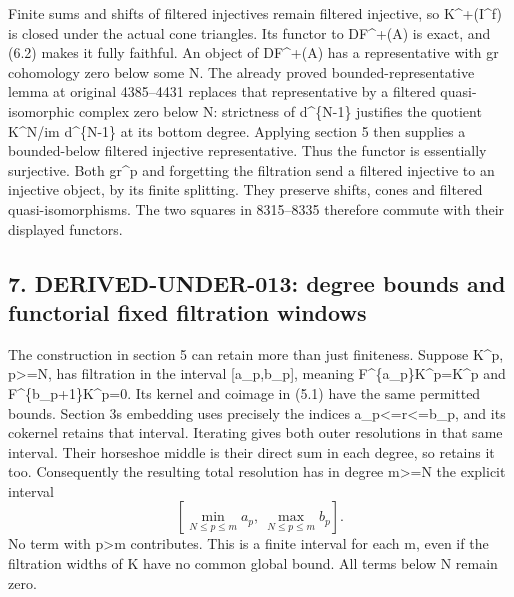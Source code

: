 Finite sums and shifts of filtered injectives remain filtered injective,\allowbreak{} so K\textasciicircum{}\allowbreak{}+(I\textasciicircum{}f)\allowbreak{} is closed under the actual cone triangles. Its functor to DF\textasciicircum{}\allowbreak{}+(A)\allowbreak{} is exact,\allowbreak{} and (6.2)\allowbreak{} makes it fully faithful. An object of DF\textasciicircum{}\allowbreak{}+(A)\allowbreak{} has a representative with gr cohomology zero below some N. The already proved bounded-representative lemma at original 4385–\allowbreak{}4431 replaces that representative by a filtered quasi-isomorphic complex zero below N:\allowbreak{} strictness of d\^{}\{N-1\} justifies the quotient K\textasciicircum{}N/\allowbreak{}im d\^{}\{N-1\} at its bottom degree. Applying section 5 then supplies a bounded-below filtered injective representative. Thus the functor is essentially surjective. Both gr\^{}p and forgetting the filtration send a filtered injective to an injective object,\allowbreak{} by its finite splitting. They preserve shifts,\allowbreak{} cones and filtered quasi-isomorphisms. The two squares in 8315–\allowbreak{}8335 therefore commute with their displayed functors.

\subsection{\texorpdfstring{7. DERIVED-UNDER-013:\allowbreak{} degree bounds and functorial fixed filtration windows}{7.  degree bounds and functorial fixed filtration windows}}\label{proofs-7589-8350-derived-under-013-degree-bounds-and-functorial-fixed-filtration-windows}

The construction in section 5 can retain more than just finiteness. Suppose K\textasciicircum{}p,\allowbreak{} p>\allowbreak{}=N,\allowbreak{} has filtration in the interval [a\_\allowbreak{}p,\allowbreak{}b\_\allowbreak{}p]\allowbreak{},\allowbreak{} meaning F\textasciicircum{}\{a\_\allowbreak{}p\}K\textasciicircum{}p\allowbreak{}=K\textasciicircum{}p and F\textasciicircum{}\{b\_\allowbreak{}p\allowbreak{}+1\}K\textasciicircum{}p\allowbreak{}=0. Its kernel and coimage in (5.1)\allowbreak{} have the same permitted bounds. Section 3\textquotesingle s embedding uses precisely the indices a\_\allowbreak{}p<\allowbreak{}=r<\allowbreak{}=b\_\allowbreak{}p,\allowbreak{} and its cokernel retains that interval. Iterating gives both outer resolutions in that same interval. Their horseshoe middle is their direct sum in each degree,\allowbreak{} so retains it too. Consequently the resulting total resolution has in degree m>\allowbreak{}=N the explicit interval \[
 \left[\min_{N\le p\le m}a_p,\
       \max_{N\le p\le m}b_p\right].                         \tag{7.1}
\] No term with p\textgreater m contributes. This is a finite interval for each m,\allowbreak{} even if the filtration widths of K have no common global bound. All terms below N remain zero.

